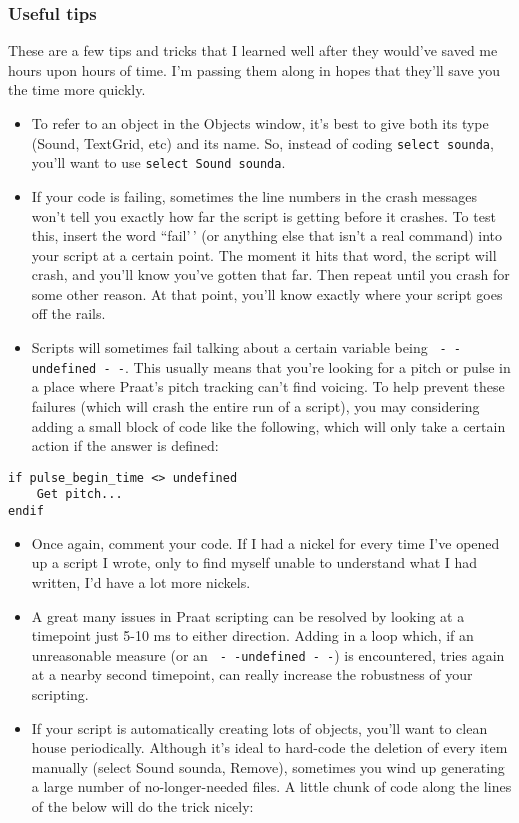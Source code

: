 \documentclass[11pt]{article}
\begin{document}
\hypertarget{useful-tips}{%
\subsubsection{Useful tips}\label{useful-tips}}

\label{scriptingtips}

These are a few tips and tricks that I learned well after they would've
saved me hours upon hours of time. I'm passing them along in hopes that
they'll save you the time more quickly.

\begin{itemize}
\item
  To refer to an object in the Objects window, it's best to give both
  its type (Sound, TextGrid, etc) and its name. So, instead of coding
  \texttt{select sounda}, you'll want to use
  \texttt{select Sound sounda}.
\item
  If your code is failing, sometimes the line numbers in the crash
  messages won't tell you exactly how far the script is getting before
  it crashes. To test this, insert the word ``fail'\,' (or anything else
  that isn't a real command) into your script at a certain point. The
  moment it hits that word, the script will crash, and you'll know
  you've gotten that far. Then repeat until you crash for some other
  reason. At that point, you'll know exactly where your script goes off
  the rails.
\item
  Scripts will sometimes fail talking about a certain variable being
  \texttt{ - -undefined - -}. This usually means that you're looking for
  a pitch or pulse in a place where Praat's pitch tracking can't find
  voicing. To help prevent these failures (which will crash the entire
  run of a script), you may considering adding a small block of code
  like the following, which will only take a certain action if the
  answer is defined:
\end{itemize}

\begin{verbatim} 
if pulse_begin_time <> undefined
    Get pitch...
endif
\end{verbatim}

\begin{itemize}
\item
  Once again, comment your code. If I had a nickel for every time I've
  opened up a script I wrote, only to find myself unable to understand
  what I had written, I'd have a lot more nickels.
\item
  A great many issues in Praat scripting can be resolved by looking at a
  timepoint just 5-10 ms to either direction. Adding in a loop which, if
  an unreasonable measure (or an \texttt{ - -undefined - -}) is
  encountered, tries again at a nearby second timepoint, can really
  increase the robustness of your scripting.
\item
  If your script is automatically creating lots of objects, you'll want
  to clean house periodically. Although it's ideal to hard-code the
  deletion of every item manually (select Sound sounda, Remove),
  sometimes you wind up generating a large number of no-longer-needed
  files. A little chunk of code along the lines of the below will do the
  trick nicely:
\end{itemize}
\end{document}
